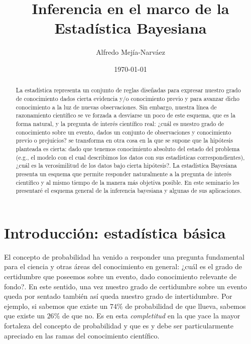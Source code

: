 \documentclass[a4paper,twoside]{article}
\title{Inferencia en el marco de la Estadística Bayesiana}
\author{Alfredo Mejía-Narváez}
\date{\today}
\begin{document}
\maketitle

\begin{abstract}
%
La estadística representa un conjunto de reglas diseñadas para expresar nuestro grado de
conocimiento dados cierta evidencia y/o conocimiento previo y para avanzar dicho conocimiento a la
luz de nuevas observaciones. Sin embargo, nuestra línea de razonamiento científico se ve forzada a
desviarse un poco de este esquema, que es la forma natural, y la pregunta de interés científico
real: ¿cuál es nuestro grado de conocimiento sobre un evento, dados un conjunto de observaciones y
conocimiento previo o prejuicios? se transforma en otra cosa en la que se supone que la hipótesis
planteada es cierta: dado que tenemos conocimiento absoluto del estado del problema (e.g., el modelo
con el cual describimos los datos con sus estadísticas correspondientes), ¿cuál es la verosimilitud
de los datos bajo cierta hipótesis?. La estadística Bayesiana presenta un esquema que permite
responder naturalmente a la pregunta de interés científico y al mismo tiempo de la manera más
objetiva posible. En este seminario les presentaré el esquema general de la inferencia bayesiana y
algunas de sus aplicaciones.
%
\end{abstract}


\section*{Introducción: estadística básica}

El concepto de probabilidad ha venido a responder una pregunta fundamental para el ciencia y otras
áreas del conocimiento en general: ¿cuál es el grado de certidumbre que poseemos sobre un evento,
dado conocimiento relevante de fondo?. En este sentido, una vez nuestro grado de certidumbre sobre
un evento queda por sentado también así queda nuestro grado de intertidumbre. Por ejemplo, si
sabemos que existe un $74\%$ de probabilidad de que llueva, sabemos que existe un $26\%$ de que
no. Es en esta \emph{completitud} en la que yace la mayor fortaleza del concepto de probabilidad y
que es y debe ser particularmente apreciado en las ramas del conocimiento científico.
\end{document}
